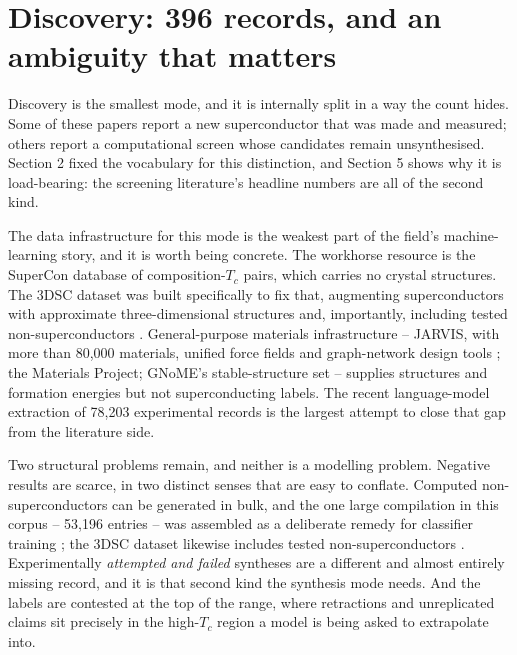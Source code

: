 \documentclass[
  11pt,
]{article}
\begin{document}
\section{Discovery: 396 records, and an ambiguity that
matters}\label{discovery-396-records-and-an-ambiguity-that-matters}

Discovery is the smallest mode, and it is internally split in a way the
count hides. Some of these papers report a new superconductor that was
made and measured; others report a computational screen whose candidates
remain unsynthesised. Section 2 fixed the vocabulary for this
distinction, and Section 5 shows why it is load-bearing: the screening
literature's headline numbers are all of the second kind.

The data infrastructure for this mode is the weakest part of the field's
machine-learning story, and it is worth being concrete. The workhorse
resource is the SuperCon database of composition-\(T_c\) pairs, which
carries no crystal structures. The 3DSC dataset was built specifically
to fix that, augmenting superconductors with approximate
three-dimensional structures and, importantly, including tested
non-superconductors \citep{sommer20223dsc}. General-purpose materials
infrastructure -- JARVIS, with more than 80,000 materials, unified force
fields and graph-network design tools \citep{wines2023recent}; the
Materials Project; GNoME's stable-structure set
\citep{merchant2023scaling} -- supplies structures and formation
energies but not superconducting labels. The recent language-model
extraction of 78,203 experimental records \citep{itani2025large} is the
largest attempt to close that gap from the literature side.

Two structural problems remain, and neither is a modelling problem.
Negative results are scarce, in two distinct senses that are easy to
conflate. Computed non-superconductors can be generated in bulk, and the
one large compilation in this corpus -- 53,196 entries -- was assembled
as a deliberate remedy for classifier training \citep{gashmard2025ai};
the 3DSC dataset likewise includes tested non-superconductors
\citep{sommer20223dsc}. Experimentally \emph{attempted and failed}
syntheses are a different and almost entirely missing record, and it is
that second kind the synthesis mode needs. And the labels are contested
at the top of the range, where retractions
\citep{snider2020retracted, dasenbrock2023retracted} and unreplicated
claims \citep{lee2023lk99} sit precisely in the high-\(T_c\) region a
model is being asked to extrapolate into.
\end{document}
